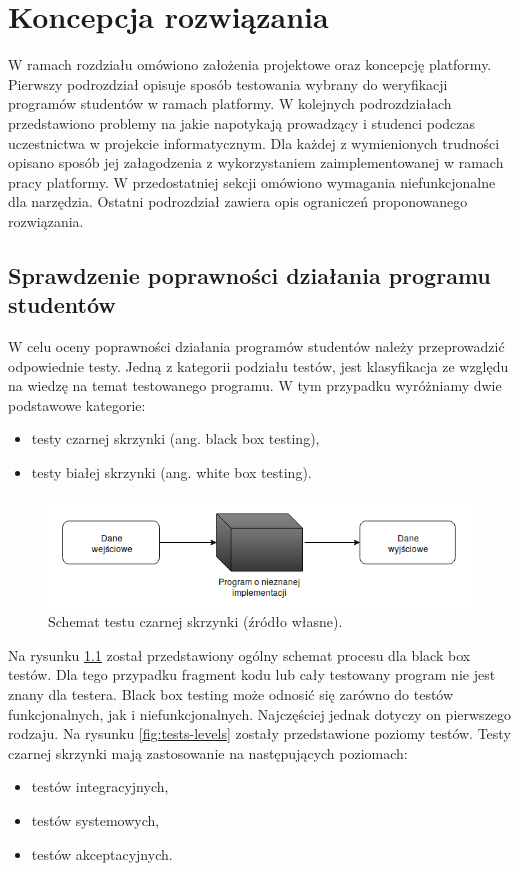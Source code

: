 \chapter{Koncepcja rozwiązania}
\label{chapter:requirements}

W ramach rozdziału omówiono założenia projektowe oraz koncepcję platformy.
Pierwszy podrozdział opisuje sposób testowania wybrany do weryfikacji programów studentów w ramach platformy.
W kolejnych podrozdziałach przedstawiono problemy na jakie napotykają prowadzący i studenci podczas uczestnictwa w projekcie informatycznym.
Dla każdej z wymienionych trudności opisano sposób jej załagodzenia z wykorzystaniem zaimplementowanej w ramach pracy platformy.
W przedostatniej sekcji omówiono wymagania niefunkcjonalne dla narzędzia.
Ostatni podrozdział zawiera opis ograniczeń proponowanego rozwiązania.

\section{Sprawdzenie poprawności działania programu studentów}

W celu oceny poprawności działania programów studentów należy przeprowadzić odpowiednie testy.
Jedną z kategorii podziału testów, jest klasyfikacja ze względu na wiedzę na temat testowanego programu.
W tym przypadku wyróżniamy dwie podstawowe kategorie:
\begin{itemize}
    \item testy czarnej skrzynki (ang. black box testing),
    \item testy białej skrzynki (ang. white box testing).
\end{itemize}

\begin{figure}[h]
    \centering
    \includegraphics[width = 13cm]{chapter02/black-box.png}
    \caption{Schemat testu czarnej skrzynki (źródło własne).}
    \label{fig:black-box}
\end{figure}

Na rysunku \ref{fig:black-box} został przedstawiony ogólny schemat procesu dla black box testów.
Dla tego przypadku fragment kodu lub cały testowany program nie jest znany dla testera.
Black box testing może odnosić się zarówno do testów funkcjonalnych, jak i niefunkcjonalnych.
Najczęściej jednak dotyczy on pierwszego rodzaju.
Na rysunku \ref{fig:tests-levels} zostały przedstawione poziomy testów.
Testy czarnej skrzynki mają zastosowanie na następujących poziomach:
\begin{itemize}
    \item testów integracyjnych,
    \item testów systemowych,
    \item testów akceptacyjnych.
\end{itemize}

